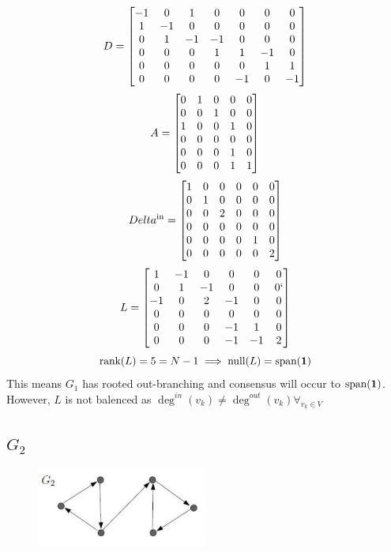 \documentclass[]{article}
\numberwithin{equation}{section}
\begin{document}
\[
    D = \mqty[
        -1 & 0  & 1  & 0  & 0  & 0  & 0  \\
        1  & -1 & 0  & 0  & 0  & 0  & 0  \\
        0  & 1  & -1 & -1 & 0  & 0  & 0  \\
        0  & 0  & 0  & 1  & 1  & -1 & 0  \\
        0  & 0  & 0  & 0  & 0  & 1  & 1  \\
        0  & 0  & 0  & 0  & -1 & 0  & -1
    ]
\]\[
    A = \mqty[
        0 & 1 & 0 & 0 & 0 \\
        0 & 0 & 1 & 0 & 0 \\
        1 & 0 & 0 & 1 & 0 \\
        0 & 0 & 0 & 0 & 0 \\
        0 & 0 & 0 & 1 & 0 \\
        0 & 0 & 0 & 1 & 1
    ]
\]\[
    Delta^{\text{in}} = \mqty[
        1 & 0 & 0 & 0 & 0 & 0 \\
        0 & 1 & 0 & 0 & 0 & 0 \\
        0 & 0 & 2 & 0 & 0 & 0 \\
        0 & 0 & 0 & 0 & 0 & 0 \\
        0 & 0 & 0 & 0 & 1 & 0 \\
        0 & 0 & 0 & 0 & 0 & 2
    ]
\]\[
    L = \mqty[
        1  & -1 & 0  & 0  & 0  & 0 \\
        0  & 1  & -1 & 0  & 0  & 0 `\\
        -1 & 0  & 2  & -1 & 0  & 0 \\
        0  & 0  & 0  & 0  & 0  & 0 \\
        0  & 0  & 0  & -1 & 1  & 0 \\
        0  & 0  & 0  & -1 & -1 & 2
    ]
\] \[
    \text{rank}(L) = 5 = N-1 \implies \text{null}(L) = \text{span}(\vb{1})
\] This means $G_1$ has rooted out-branching and consensus will occur to $\text{span}(\vb{1})$.
However, $L$ is not balenced as $\deg^{in}(v_k) \neq \deg^{out}(v_k) \forall_{v_k \in V}$

\newpage
\subsection{$G_2$}
\begin{figure}[h]
    \centering
    \includegraphics[width=0.5\textwidth]{figs/pblm6b.png}
\end{figure}
\end{document}
